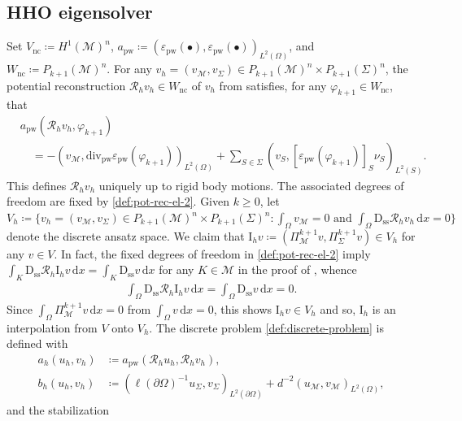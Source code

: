\documentclass[a4paper]{amsart}
\numberwithin{equation}{section}
\renewcommand{\d}[1]{\,\mathrm{d}#1}
\renewcommand{\div}{\mathrm{div}}
\newcommand{\I}{\mathrm{I}}
\newcommand{\D}{\mathrm{D}}
\newcommand{\Mcal}{\mathcal{M}}
\newcommand{\pw}{\mathrm{pw}}
\theoremstyle{remark}
\theoremstyle{definition}
\theoremstyle{assumptionnoperiod}
\begin{document}
\subsection{HHO eigensolver}\label{sec:HHO-comp-emb}
Set $V_\mathrm{nc} \coloneqq H^1(\Mcal)^n$, $a_\pw \coloneqq (\varepsilon_\pw (\bullet), \varepsilon_\pw (\bullet))_{L^2(\Omega)}$, and $W_\mathrm{nc} \coloneqq P_{k+1}(\Mcal)^n$.
For any $v_h = (v_\Mcal, v_\Sigma) \in P_{k+1}(\Mcal)^n \times P_{k+1}(\Sigma)^n$, the potential reconstruction $\mathcal{R}_h v_h \in W_\mathrm{nc}$ of $v_h$ from \cite{DiPietroErn2015} satisfies, for any $\varphi_{k+1} \in W_\mathrm{nc}$, that
\begin{align}\label{def:pot-rec-ex-2-1}
	&a_\pw(\mathcal{R}_h v_h, \varphi_{k+1}) \nonumber\\
	&\quad= - (v_\Mcal, \div_\pw \varepsilon_\pw (\varphi_{k+1}))_{L^2(\Omega)} + \sum_{S \in \Sigma} (v_S, [\varepsilon_\pw (\varphi_{k+1})]_S \nu_S)_{L^2(S)}.
\end{align}
This defines $\mathcal{R}_h v_h$ uniquely up to rigid body motions. The associated degrees of freedom are fixed by \eqref{def:pot-rec-el-2}.
Given $k \geq 0$,
let $V_h \coloneqq \{v_h = (v_\Mcal, v_\Sigma) \in P_{k+1}(\Mcal)^n \times P_{k+1}(\Sigma)^n : \int_\Omega v_\Mcal = 0 \text{ and } \int_\Omega \D_\mathrm{ss} \mathcal{R}_h v_h \d{x} = 0\}$ denote the discrete ansatz space.
We claim that $\I_h v \coloneqq (\Pi_\Mcal^{k+1} v, \Pi_\Sigma^{k+1} v) \in V_h$ for any $v \in V$.
In fact, 
the fixed degrees of freedom in \eqref{def:pot-rec-el-2} imply
$\int_K \D_\mathrm{ss} \mathcal{R}_h \I_h v \d{x} = \int_K \D_\mathrm{ss} v \d{x}$ for any $K \in \Mcal$ in the proof of , whence
\begin{align*}
	\int_\Omega \D_\mathrm{ss} \mathcal{R}_h \I_h v \d{x} = \int_\Omega \D_\mathrm{ss} v \d{x} = 0.
\end{align*}
Since $\int_\Omega \Pi_\Mcal^{k+1} v \d{x} = 0$ from $\int_\Omega v \d{x} = 0$, this shows
$\I_h v \in V_h$ and so, $\I_h$ is an interpolation from $V$ onto $V_h$.
The discrete problem \eqref{def:discrete-problem} is defined with
\begin{align*}
	a_h(u_h,v_h) &\coloneqq a_\pw(\mathcal{R}_h u_h, \mathcal{R}_h v_h),\\
	b_h(u_h,v_h) &\coloneqq (\ell(\partial \Omega)^{-1} u_\Sigma, v_\Sigma)_{L^2(\partial \Omega)} + d^{-2}(u_\Mcal, v_\Mcal)_{L^2(\Omega)},
\end{align*}
and the stabilization
\end{document}
